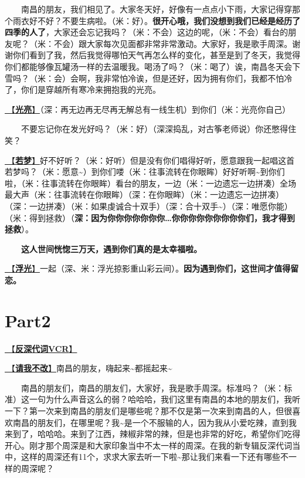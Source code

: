 \documentclass[]{ctexbook}
\begin{document}
  南昌的朋友，我们相见了。大家冬天好，好像有一点点小下雨，大家记得穿那个雨衣好不好？不要生病啦。（米：好）。\textbf{很开心哦，我们没想到我们已经是经历了四季的人了}，大家还会忘记我吗？（米：不会）这边的呢，（米：不会）看台的朋友呢？（米：不会）跟大家每次见面都非常非常激动。大家好，我是歌手周深。谢谢你们看到了我，然后我觉得哪怕天气再怎么样的变化，甚至是到了冬天，我觉得你们都能够像瓦罐汤一样的去温暖我。喝汤了吗？（米：喝了）诶，南昌冬天会下雪吗？（米：会）会啊，我非常怕冷诶，但是还好，因为拥有你们，我都不怕冷了，你们是穿越所有寒冷来拥抱我的光亮。

\hyperref[silver-linings]{🎵【\textbf{光亮}】}（深：再无边再无尽再无解总有一线生机）到你们（米：光亮你自己）

  不要忘记你在发光好吗？（米：好）（深深捣乱，对古筝老师说）你还憋得住笑？

\hyperref[ruomeng]{🎵【\textbf{若梦}】}好不好听？（米：好听）但是没有你们唱得好听，愿意跟我一起唱这首若梦吗？（米：愿意\textasciitilde）到你们喽（米：往事流转在你眼眸）好好听啊\textasciitilde 到你们啦，（米：往事流转在你眼眸）看台的朋友，一边（米：一边遗忘一边拼凑）全场最大声（米：往事流转在你眼眸）（深：在你眼眸）（米：一边遗忘一边拼凑）（深：一边拼凑）（米：如果虔诚合十双手）（深：合十双手\textasciitilde）（深：唯愿你能）（米：得到拯救）（\textbf{深：因为你你你你你你你\ldots 你你你你你你你你你们，我才得到拯救}）。

  \textbf{这人世间恍惚三万天，遇到你们真的是太幸福啦。}

\hyperref[floating-light]{🎵【\textbf{浮光}】}一起（深、米：浮光掠影重山彩云间）。\textbf{因为遇到你们，这世间才值得留恋。}

\section{Part2}\label{nanchang-20241123-part2}

\hyperref[senself-vcr]{🎥【\textbf{反深代词VCR}】}

\hyperref[brave-heart]{🎵【\textbf{请我不改}】}南昌的朋友，嗨起来\textasciitilde 都摇起来\textasciitilde{}

  南昌的朋友们，南昌的朋友们，大家好，我是歌手周深。标准吗？（米：标准）这一句为什么声音这么的弱？哈哈哈，我们这里有南昌的本地的朋友们，我听一下？第一次来到南昌的朋友们是哪些呢？那不仅是第一次来到南昌的人，但很喜欢南昌的朋友们，在哪里呢？我\textasciitilde 是一个不服输的人，因为我从小爱吃辣，直到我来到了，哈哈哈。来到了江西，辣椒非常的辣，但是也非常的好吃，希望你们吃得开心。刚才那个周深是和大家印象当中不太一样的周深。在我的新专辑反深代词当中，这样的周深还有11个，求求大家去听一下啦\textasciitilde 那让我们来看一下还有哪些不一样的周深呢？
\end{document}
